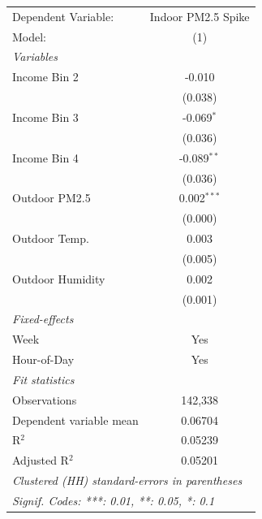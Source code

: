 
\begingroup
\centering
\begin{tabular}{lc}
   \tabularnewline \midrule \midrule
   Dependent Variable:     & Indoor PM2.5 Spike\\  
   Model:                  & (1)\\  
   \midrule
   \emph{Variables}\\
   Income Bin 2            & -0.010\\   
                           & (0.038)\\   
   Income Bin 3            & -0.069$^{*}$\\   
                           & (0.036)\\   
   Income Bin 4            & -0.089$^{**}$\\   
                           & (0.036)\\   
   Outdoor PM2.5           & 0.002$^{***}$\\   
                           & (0.000)\\   
   Outdoor Temp.           & 0.003\\   
                           & (0.005)\\   
   Outdoor Humidity        & 0.002\\   
                           & (0.001)\\   
   \midrule
   \emph{Fixed-effects}\\
   Week                    & Yes\\  
   Hour-of-Day             & Yes\\  
   \midrule
   \emph{Fit statistics}\\
   Observations            & 142,338\\  
   Dependent variable mean & 0.06704\\  
   R$^2$                   & 0.05239\\  
   Adjusted R$^2$          & 0.05201\\  
   \midrule \midrule
   \multicolumn{2}{l}{\emph{Clustered (HH) standard-errors in parentheses}}\\
   \multicolumn{2}{l}{\emph{Signif. Codes: ***: 0.01, **: 0.05, *: 0.1}}\\
\end{tabular}
\par\endgroup


